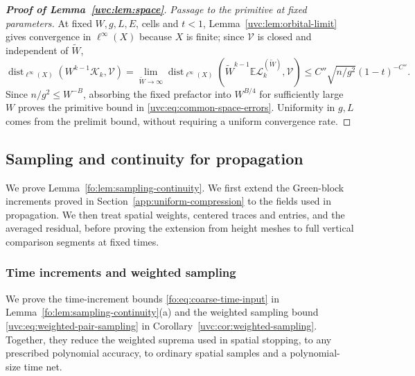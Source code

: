 \documentclass[11pt]{article}
\numberwithin{equation}{section}
\theoremstyle{remark}
\newcommand{\E}{\mathbb E}
\newcommand{\wt}{\widetilde}
\newcommand{\cL}{\mathcal L}
\newcommand{\cK}{\mathcal K}
\begin{document}
\begin{proof}[\textbf{Proof of Lemma~\ref{uvc:lem:space}}]
\smallskip\noindent\emph{Passage to the primitive at fixed parameters.}
At fixed $W,g,L,E$, cells and $t<1$, Lemma~\ref{uvc:lem:orbital-limit}
gives convergence in $\ell^\infty(X)$ because $X$ is finite;
since $\mathcal V$ is closed and independent of $\wt W$,
\[
 \operatorname{dist}_{\ell^\infty(X)}(W^{k-1}\cK_k,\mathcal V)
 =\lim_{\wt W\to\infty}
   \operatorname{dist}_{\ell^\infty(X)}(\wt W^{k-1}\E\cL_k^{(\wt W)},\mathcal V)
 \le C''\sqrt{n/g^2}(1-t)^{-C''}.
\]
Since $n/g^2\le W^{-B}$, absorbing the fixed prefactor into $W^{B/4}$
for sufficiently large $W$ proves the primitive bound in
\eqref{uvc:eq:common-space-errors}.
Uniformity in $g,L$ comes from the prelimit bound, without requiring
a uniform convergence rate.
\end{proof}

\subsection{Sampling and continuity for propagation}
\label{sec:sampling-propagation-extensions}
We prove Lemma~\ref{fo:lem:sampling-continuity}. We first extend the
Green-block increments proved in Section~\ref{app:uniform-compression}
to the fields used in propagation. We then treat spatial weights,
centered traces and entries, and the averaged residual, before proving
the extension from height meshes to full vertical comparison segments
at fixed times.

\subsubsection{Time increments and weighted sampling}
We prove the time-increment bounds \eqref{fo:eq:coarse-time-input} in
Lemma~\ref{fo:lem:sampling-continuity}(a) and the weighted sampling bound
\eqref{uvc:eq:weighted-pair-sampling} in Corollary~\ref{uvc:cor:weighted-sampling}.
Together, they reduce the weighted suprema used in spatial stopping,
to any prescribed polynomial accuracy, to ordinary spatial samples and
a polynomial-size time net.
\end{document}
